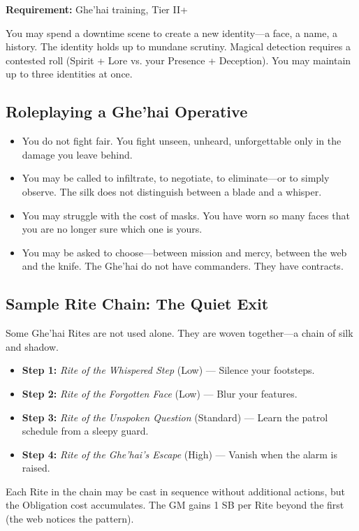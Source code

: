 \textbf{Requirement:} Ghe'hai training, Tier II+

You may spend a downtime scene to create a new identity—a face, a name, a history. The identity holds up to mundane scrutiny. Magical detection requires a contested roll (Spirit + Lore vs. your Presence + Deception). You may maintain up to three identities at once.

\subsection{Roleplaying a Ghe'hai Operative}

\begin{itemize}
\item You do not fight fair. You fight unseen, unheard, unforgettable only in the damage you leave behind.
\item You may be called to infiltrate, to negotiate, to eliminate—or to simply observe. The silk does not distinguish between a blade and a whisper.
\item You may struggle with the cost of masks. You have worn so many faces that you are no longer sure which one is yours.
\item You may be asked to choose—between mission and mercy, between the web and the knife. The Ghe'hai do not have commanders. They have contracts.
\end{itemize}

\subsection{Sample Rite Chain: The Quiet Exit}

Some Ghe'hai Rites are not used alone. They are woven together—a chain of silk and shadow.

\begin{itemize}
\item \textbf{Step 1:} \textit{Rite of the Whispered Step} (Low) — Silence your footsteps.
\item \textbf{Step 2:} \textit{Rite of the Forgotten Face} (Low) — Blur your features.
\item \textbf{Step 3:} \textit{Rite of the Unspoken Question} (Standard) — Learn the patrol schedule from a sleepy guard.
\item \textbf{Step 4:} \textit{Rite of the Ghe'hai's Escape} (High) — Vanish when the alarm is raised.
\end{itemize}

Each Rite in the chain may be cast in sequence without additional actions, but the Obligation cost accumulates. The GM gains 1 SB per Rite beyond the first (the web notices the pattern).

